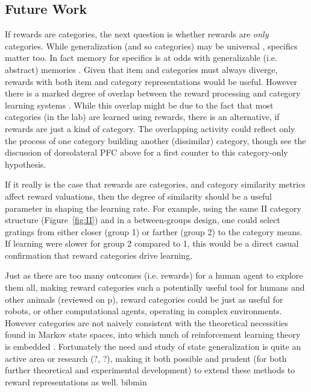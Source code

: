 \documentclass[doc,12pt]{apa}        %
\begin{document}
\subsection{Future Work}
\label{sub:future}
If rewards are categories, the next question is whether rewards are \emph{only} categories.  While generalization (and so categories) may be universal \cite{Shepard:1987p9102}, specifics matter too.  In fact memory for specifics is at odds with generalizable (i.e. abstract) memories \cite{Atallah:2004p5466}. Given that item and categories must always diverge, rewards with both item and category representations would be useful.  However there is a marked degree of overlap between the reward processing and category learning systems \cite{Seger:2010p7189,Ashby:2011p9148}.  While this overlap might be due to the fact that most categories (in the lab) are learned using rewards, there is an alternative, if rewards are just a kind of category.  The overlapping activity could reflect only the process of one category building another (dissimilar) category, though see the discussion of dorsolateral PFC above for a first counter to this category-only hypothesis.

If it really is the case that rewards are categories, and category similarity metrics affect reward valuations, then the degree of similarity should be a useful parameter in shaping the learning rate.  For example, using the same II category structure (Figure~\ref{fig:II}) and in a between-groups design, one could select gratings from either closer (group 1) or farther (group 2) to the category means. If learning were slower for group 2 compared to 1, this would be a direct casual confirmation that reward categories drive learning. 

Just as there are too many outcomes (i.e. rewards) for a human agent to explore them all, making reward categories such a potentially useful tool for humans and other animals (reviewed on p\pageref{sub:gen}), reward categories could be just as useful for robots, or other computational agents, operating in complex environments.   However categories are not naively consistent with the theoretical necessities found in Markov state spaces, into which much of reinforcement learning theory is embedded \cite{Sutton:1998p9247}.  Fortunately the need and study of state generalization is quite an active area or research (?, ?), making it both possible and prudent (for both further theoretical and experimental development) to extend these methods to reward representations as well. 
\clearpage
\newpage
 {bibmin}
\end{document}
